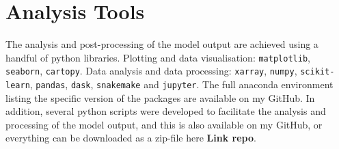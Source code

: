 \begin{table}[htpb]\label{tab:sensitivity_exp}
\caption{The model sensitivity experiments that have been performed}
\centering

\end{table}

\section{Analysis Tools}

The analysis and post-processing of the model output are achieved using a handful of python libraries. Plotting and data visualisation:  \verb|matplotlib|, \verb|seaborn|, \verb|cartopy|. Data analysis and data processing: \verb|xarray|, \verb|numpy|, \verb|scikit-learn|, \verb|pandas|, \verb|dask|, \verb|snakemake| and \verb|jupyter|. The full anaconda environment listing the specific version of the packages are available on my GitHub. In addition, several python scripts were developed to facilitate the analysis and processing of the model output, and this is also available on my GitHub, or everything can be downloaded as a zip-file here \textbf{Link repo}. 

